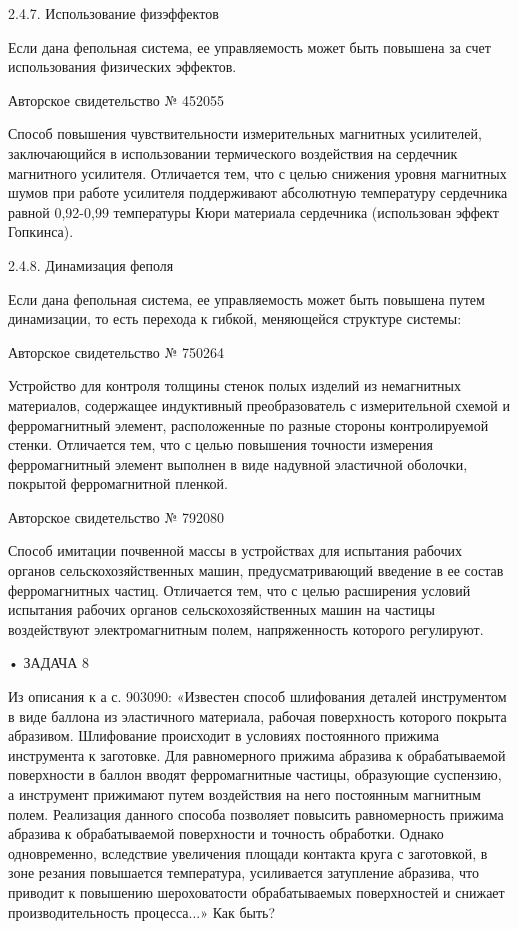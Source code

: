 2.4.7. Использование физэффектов

Если дана фепольная  система, ее управляемость может  быть повышена за
счет использования физических эффектов.


Авторское свидетельство № 452055

Способ повышения чувствительности  измерительных магнитных усилителей,
заключающийся  в использовании  термического воздействия  на сердечник
магнитного  усилителя. Отличается  тем,  что с  целью снижения  уровня
магнитных   шумов  при   работе   усилителя  поддерживают   абсолютную
температуру  сердечника равной  0,92-0,99  температуры Кюри  материала
сердечника (использован эффект Гопкинса).


2.4.8. Динамизация феполя

Если  дана фепольная  система,  ее управляемость  может быть  повышена
путем  динамизации, то  есть перехода  к гибкой,  меняющейся структуре
системы:


Авторское свидетельство № 750264

Устройство для  контроля толщины  стенок полых изделий  из немагнитных
материалов,  содержащее  индуктивный преобразователь  с  измерительной
схемой  и  ферромагнитный  элемент, расположенные  по  разные  стороны
контролируемой стенки. Отличается тем,  что с целью повышения точности
измерения ферромагнитный  элемент выполнен в виде  надувной эластичной
оболочки, покрытой ферромагнитной пленкой.


Авторское свидетельство № 792080

Способ имитации  почвенной массы  в устройствах для  испытания рабочих
органов  сельскохозяйственных машин,  предусматривающий введение  в ее
состав ферромагнитных  частиц. Отличается тем, что  с целью расширения
условий  испытания  рабочих   органов  сельскохозяйственных  машин  на
частицы  воздействуют электромагнитным  полем, напряженность  которого
регулируют.


• ЗАДАЧА 8

Из  описания  к  а  с. 903090:  «Известен  способ  шлифования  деталей
инструментом  в   виде  баллона  из  эластичного   материала,  рабочая
поверхность  которого  покрыта   абразивом.  Шлифование  происходит  в
условиях постоянного прижима инструмента к заготовке. Для равномерного
прижима  абразива   к  обрабатываемой  поверхности  в   баллон  вводят
ферромагнитные частицы,  образующие суспензию, а  инструмент прижимают
путем  воздействия  на  него постоянным  магнитным  полем.  Реализация
данного способа  позволяет повысить  равномерность прижима  абразива к
обрабатываемой поверхности и  точность обработки. Однако одновременно,
вследствие  увеличения площади  контакта  круга с  заготовкой, в  зоне
резания повышается  температура, усиливается затупление  абразива, что
приводит  к  повышению  шероховатости  обрабатываемых  поверхностей  и
снижает производительность процесса...» Как быть?


